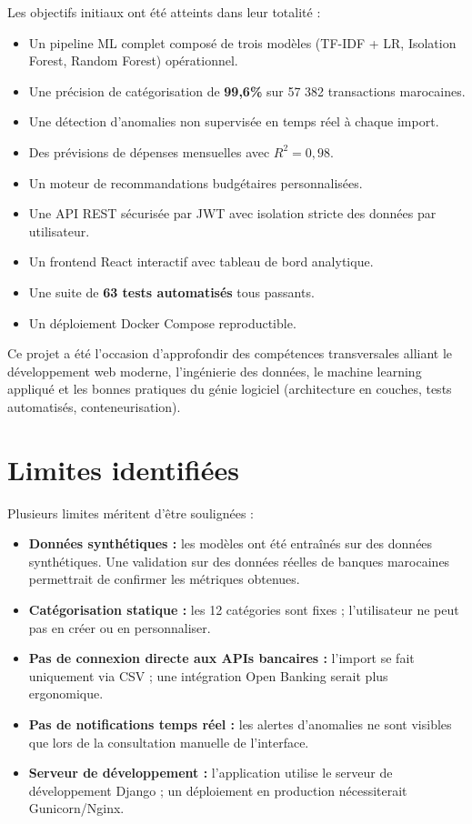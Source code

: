 \documentclass[12pt,a4paper]{report}
\begin{document}
Les objectifs initiaux ont été atteints dans leur totalité :

\begin{itemize}[noitemsep]
  \item[\ding{51}] Un pipeline ML complet composé de trois modèles
    (TF-IDF + LR, Isolation Forest, Random Forest) opérationnel.
  \item[\ding{51}] Une précision de catégorisation de \textbf{99,6\%}
    sur 57 382 transactions marocaines.
  \item[\ding{51}] Une détection d'anomalies non supervisée en temps réel
    à chaque import.
  \item[\ding{51}] Des prévisions de dépenses mensuelles avec $R^2 = 0{,}98$.
  \item[\ding{51}] Un moteur de recommandations budgétaires personnalisées.
  \item[\ding{51}] Une API REST sécurisée par JWT avec isolation stricte
    des données par utilisateur.
  \item[\ding{51}] Un frontend React interactif avec tableau de bord analytique.
  \item[\ding{51}] Une suite de \textbf{63 tests automatisés} tous passants.
  \item[\ding{51}] Un déploiement Docker Compose reproductible.
\end{itemize}

Ce projet a été l'occasion d'approfondir des compétences transversales
alliant le développement web moderne, l'ingénierie des données, le machine
learning appliqué et les bonnes pratiques du génie logiciel (architecture
en couches, tests automatisés, conteneurisation).

\section*{Limites identifiées}

Plusieurs limites méritent d'être soulignées :

\begin{itemize}[noitemsep]
  \item \textbf{Données synthétiques :} les modèles ont été entraînés sur
    des données synthétiques. Une validation sur des données réelles de
    banques marocaines permettrait de confirmer les métriques obtenues.
  \item \textbf{Catégorisation statique :} les 12 catégories sont fixes ;
    l'utilisateur ne peut pas en créer ou en personnaliser.
  \item \textbf{Pas de connexion directe aux APIs bancaires :} l'import
    se fait uniquement via CSV ; une intégration Open Banking serait
    plus ergonomique.
  \item \textbf{Pas de notifications temps réel :} les alertes d'anomalies
    ne sont visibles que lors de la consultation manuelle de l'interface.
  \item \textbf{Serveur de développement :} l'application utilise le
    serveur de développement Django ; un déploiement en production
    nécessiterait Gunicorn/Nginx.
\end{itemize}
\end{document}
